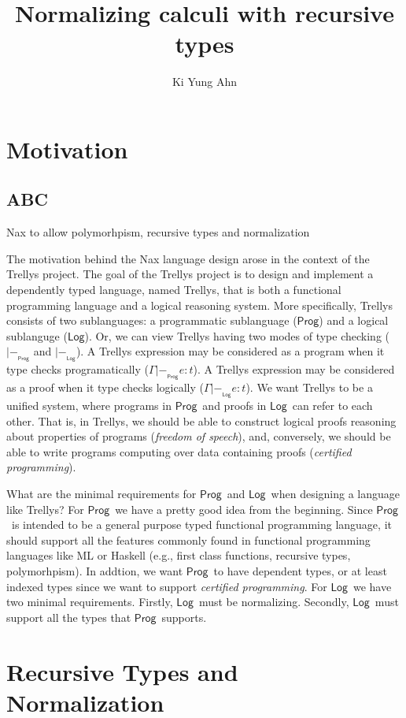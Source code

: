 \documentclass[a4paper,12pt]{book}
\title{Normalizing calculi with recursive types}
\author{Ki Yung Ahn}
\newcommand{\Prog}[0]{\ensuremath{\mathsf{Prog}}}
\newcommand{\Log}[0]{\ensuremath{\mathsf{Log}}}
\begin{document}
\maketitle
\tableofcontents

\part{Motivation}
\chapter{ABC}
Nax to allow polymorhpism, recursive types and normalization

The motivation behind the Nax language design arose in the context of
the Trellys project. The goal of the Trellys project is to design and
implement a dependently typed language, named Trellys, that is both
a functional programming language and a logical reasoning system.
More specifically, Trellys consists of two sublanguages:
a programmatic sublanguage (\Prog) and a logical sublanguge (\Log).
Or, we can view Trellys having two modes of type checking
($|-_{\!\!\!_\Prog}$ and $|-_{\!\!\!_\Log}$).
A Trellys expression may be considered as a program when it type checks
programatically ($\Gamma |-_{\!\!\!_\Prog} e : t$).
A Trellys expression may be considered as a proof when it type checks
logically ($\Gamma |-_{\!\!\!_\Log} e : t$).
We want Trellys to be a unified system, where programs in \Prog\ and
proofs in \Log\ can refer to each other. That is, in Trellys, we should
be able to construct logical proofs reasoning about properties of programs
(\emph{freedom of speech}), and, conversely, we should be able to write
programs computing over data containing proofs (\emph{certified programming}).

What are the minimal requirements for \Prog\ and \Log\, when designing
a language like Trellys?
For \Prog\, we have a pretty good idea from the beginning. Since \Prog\ is
intended to be a general purpose typed functional programming language,
it should support all the features commonly found in functional programming
languages like ML or Haskell (e.g., first class functions, recursive types,
polymorhpism). In addtion, we want \Prog\ to have dependent types, or at least
indexed types since we want to support \emph{certified programming}.
For \Log\, we have two minimal requirements.
Firstly, \Log\ must be normalizing.
Secondly, \Log\ must support all the types that \Prog\ supports.

\part{Recursive Types and Normalization}
\end{document}
